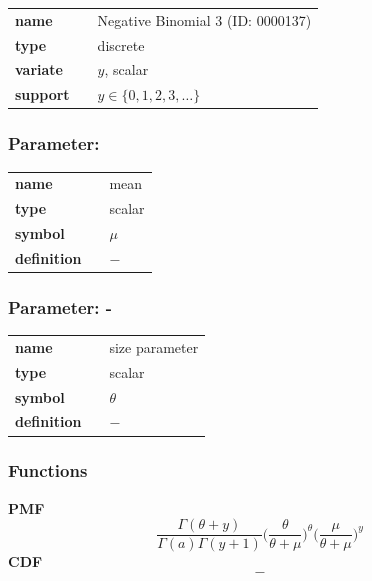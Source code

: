   \bigskip 

\begin{tabular}{p{2cm}cl}
\textbf{name} & & Negative Binomial 3 (ID: 0000137)\\ 
 
\textbf{type} & & discrete \\ 

\textbf{variate} & & $y$, scalar \\ 

\textbf{support} & & $y \in \{0,1,2,3,\dots\}$
\end{tabular}


\subsubsection*{Parameter: }

\noindent\begin{tabular}{p{2cm}cl}
\textbf{name} & & mean \\
\textbf{type} & & scalar \\
\textbf{symbol} & & $\mu$  \\
\textbf{definition} & & $-$
\end{tabular}
\subsubsection*{Parameter: -}

\noindent\begin{tabular}{p{2cm}cl}
\textbf{name} & & size parameter \\
\textbf{type} & & scalar \\
\textbf{symbol} & & $\theta$  \\
\textbf{definition} & & $-$
\end{tabular}
\subsubsection*{Functions}

\smallskip \noindent \hspace{.2cm} \textbf{PMF} 
\begin{equation*}\frac{\Gamma(\theta + y)}{\Gamma(a)\Gamma(y+1)} \Big(\frac{\theta}{\theta + \mu} \Big)^{\theta} 
\Big(\frac{\mu}{\theta + \mu} \Big)^{y}\end{equation*}
\smallskip \noindent \hspace{.2cm} \textbf{CDF} 
\begin{equation*}-\end{equation*}
\smallskip
